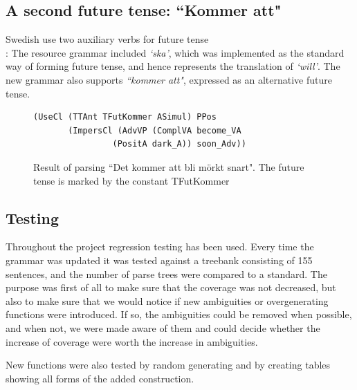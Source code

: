 \documentclass[10pt, a4paper]{article}
\begin{document}
\subsection{A second future tense: ``Kommer att"}
Swedish use two auxiliary verbs for future tense \\
\cite[p. 246]{H&H}:
The resource grammar included 
\emph{`ska'}, which was implemented as the standard way of forming future
tense, and hence represents the translation of
\emph{`will'}. 
The new grammar also supports \emph{``kommer att"}, expressed as an alternative
future tense.
\begin{figure}[h]
\begin{verbatim}
(UseCl (TTAnt TFutKommer ASimul) PPos 
       (ImpersCl (AdvVP (ComplVA become_VA 
                (PositA dark_A)) soon_Adv))
\end{verbatim}
\caption{Result of parsing ``Det kommer att bli m{\"o}rkt snart". The future tense
         is marked by the constant TFutKommer}
  \label{fig:kommeratt}
\end{figure}

\subsection{Testing}
Throughout the project regression testing has been used. Every time the grammar was updated
it was tested against a treebank consisting of 155 sentences, and the number of
parse trees were compared to a standard.
The purpose was first of all to
make sure that the coverage was not decreased, but also to make sure that we
would notice if new ambiguities or overgenerating functions were introduced.
If so, the ambiguities could be removed when possible, and when not, we were made
aware of them and could decide whether the increase of coverage were worth the
increase in ambiguities.

New functions were also tested by random generating and by creating tables showing
all forms of the added construction.
\end{document}
